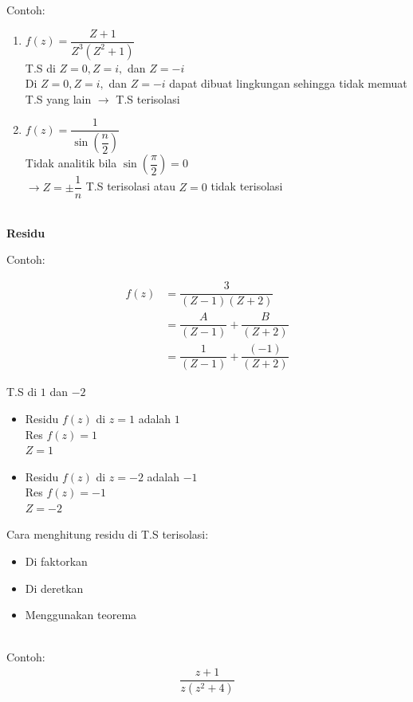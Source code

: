 \documentclass{article}
\begin{document}
Contoh:

\begin{enumerate}
    \item   $f(z) = \dfrac{Z+1}{Z^3(Z^2+1)}$ \\
          T.S di $Z=0, Z=i,$ dan $Z=-i$ \\
          Di $Z=0, Z=i,$ dan $Z=-i$ dapat dibuat lingkungan sehingga tidak memuat T.S yang lain $\rightarrow$ T.S terisolasi
    \item   $f(z) = \dfrac{1}{\sin (\dfrac{n}{2})}$ \\
          Tidak analitik bila $\sin (\dfrac{\pi}{2})=0$ \\
          $ \rightarrow Z = \pm \dfrac{1}{n}$ T.S terisolasi atau $Z=0$ tidak terisolasi
\end{enumerate}
\leavevmode\\

\textbf{Residu}

Contoh:

\begin{align}
    f(z) & = \dfrac{3}{(Z-1)(Z+2)}
    \nonumber                                       \\
         & = \dfrac{A}{(Z-1)} + \dfrac{B}{(Z+2)}
    \nonumber                                       \\
         & = \dfrac{1}{(Z-1)} + \dfrac{(-1)}{(Z+2)}
    \nonumber
\end{align}

T.S di $1$ dan $-2$
\begin{itemize}
    \item   Residu $f(z)$ di $z=1$ adalah $1$ \\
          Res $f(z)=1$ \\
          $Z=1$
    \item   Residu $f(z)$ di $z=-2$ adalah $-1$ \\
          Res $f(z)=-1$ \\
          $Z=-2$
\end{itemize}

Cara menghitung residu di T.S terisolasi:
\begin{itemize}
    \item Di faktorkan
    \item Di deretkan
    \item Menggunakan teorema
\end{itemize}
\leavevmode\\

Contoh:
\begin{align}
    \dfrac{z+1}{z(z^2+4)}
    \nonumber
\end{align}
\end{document}
